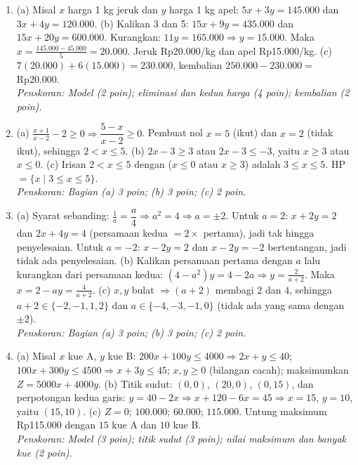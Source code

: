 \documentclass[a4paper,11pt]{article}
\newcommand{\dis}{\displaystyle}
\newcounter{no}
\begin{document}
\small\begin{enumerate}[leftmargin=2em,itemsep=3pt,topsep=2pt]
\item[\textbf{1.}] (a) Misal $x$ harga 1 kg jeruk dan $y$ harga 1 kg apel: $5x+3y=145.000$ dan $3x+4y=120.000$. (b) Kalikan 3 dan 5: $15x+9y=435.000$ dan $15x+20y=600.000$. Kurangkan: $11y=165.000\Rightarrow y=15.000$. Maka $x=\frac{145.000-45.000}{5}=20.000$. Jeruk Rp20.000/kg dan apel Rp15.000/kg. (c) $7(20.000)+6(15.000)=230.000$, kembalian $250.000-230.000=$ Rp20.000. \\ \textit{Penskoran: Model (2 poin); eliminasi dan kedua harga (4 poin); kembalian (2 poin).}
\item[\textbf{2.}] (a) $\dis\frac{x+1}{x-2}-2\ge0\Rightarrow\dfrac{5-x}{x-2}\ge0$. Pembuat nol $x=5$ (ikut) dan $x=2$ (tidak ikut), sehingga $2<x\le5$. (b) $2x-3\ge3$ atau $2x-3\le-3$, yaitu $x\ge3$ atau $x\le0$. (c) Irisan $2<x\le5$ dengan ($x\le0$ atau $x\ge3$) adalah $3\le x\le5$. HP $=\{x\mid3\le x\le5\}$. \\ \textit{Penskoran: Bagian (a) 3 poin; (b) 3 poin; (c) 2 poin.}
\item[\textbf{3.}] (a) Syarat sebanding: $\dis\frac1a=\dfrac a4\Rightarrow a^{2}=4\Rightarrow a=\pm2$. Untuk $a=2$: $x+2y=2$ dan $2x+4y=4$ (persamaan kedua $=2\times$ pertama), jadi tak hingga penyelesaian. Untuk $a=-2$: $x-2y=2$ dan $x-2y=-2$ bertentangan, jadi tidak ada penyelesaian. (b) Kalikan persamaan pertama dengan $a$ lalu kurangkan dari persamaan kedua: $(4-a^{2})y=4-2a\Rightarrow y=\dis\frac{2}{a+2}$. Maka $x=2-ay=\dis\frac{4}{a+2}$. (c) $x,y$ bulat $\Rightarrow(a+2)$ membagi $2$ dan $4$, sehingga $a+2\in\{-2,-1,1,2\}$ dan $a\in\{-4,-3,-1,0\}$ (tidak ada yang sama dengan $\pm2$). \\ \textit{Penskoran: Bagian (a) 3 poin; (b) 3 poin; (c) 2 poin.}
\item[\textbf{4.}] (a) Misal $x$ kue A, $y$ kue B: $200x+100y\le4000\Rightarrow2x+y\le40$; $100x+300y\le4500\Rightarrow x+3y\le45$; $x,y\ge0$ (bilangan cacah); maksimumkan $Z=5000x+4000y$. (b) Titik sudut: $(0,0)$, $(20,0)$, $(0,15)$, dan perpotongan kedua garis: $y=40-2x\Rightarrow x+120-6x=45\Rightarrow x=15$, $y=10$, yaitu $(15,10)$. (c) $Z=0$; $100.000$; $60.000$; $115.000$. Untung maksimum Rp115.000 dengan $15$ kue A dan $10$ kue B. \\ \textit{Penskoran: Model (3 poin); titik sudut (3 poin); nilai maksimum dan banyak kue (2 poin).}
\par\vspace{0.3em}\begin{center}

\end{center}
\end{enumerate}
\end{document}

